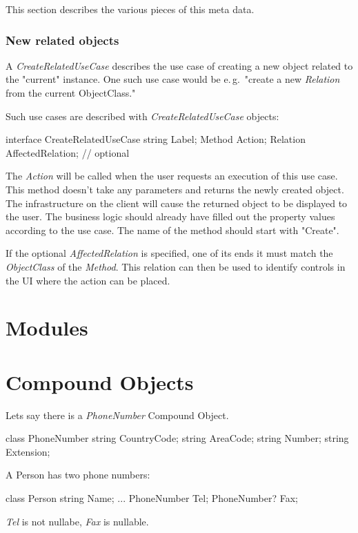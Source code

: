 This section describes the various pieces of this meta data.

\subsubsection{New related objects}

A \emph{CreateRelatedUseCase} describes the use case of creating a new
object related to the "current" instance. One such use case would be
e.\,g.~"create a new \emph{Relation} from the current ObjectClass."

Such use cases are described with \emph{CreateRelatedUseCase} objects:

\begin{CS}
interface CreateRelatedUseCase
{
	string Label;
	Method Action;
	Relation AffectedRelation; // optional
}
\end{CS}

The \emph{Action} will be called when the user requests an execution of
this use case. This method doesn't take any parameters and returns the
newly created object. The infrastructure on the client will cause the
returned object to be displayed to the user. The business logic should
already have filled out the property values according to the use case.
The name of the method should start with "Create".

If the optional \emph{AffectedRelation} is specified, one of its ends it
must match the \emph{ObjectClass} of the \emph{Method}. This relation
can then be used to identify controls in the UI where the action can be
placed.

\section{Modules}

\section{Compound Objects}
Lets say there is a \emph{PhoneNumber} Compound Object.
\begin{CS}
class PhoneNumber
{
	string CountryCode;
	string AreaCode;
	string Number;
	string Extension;
}
\end{CS}

A Person has two phone numbers:

\begin{CS}
class Person
{
	string Name;
	...
	PhoneNumber  Tel;
	PhoneNumber? Fax;
}
\end{CS}
\emph{Tel} is not nullabe, \emph{Fax} is nullable.

